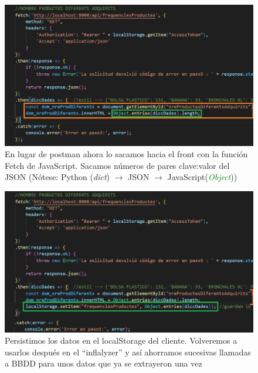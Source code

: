 \documentclass{beamer}
\begin{document}
		\begin{frame}
	
			\begin{figure}
				\centering
				\includegraphics[width=.9\linewidth]{imgEspecifiques/dashboardB}
				\caption{En lugar de postman ahora lo sacamos hacia el front con la función Fetch de JavaScript. Sacamos números de pares clave:valor del JSON (Nótese: Python (\textit{dict}) $\rightarrow$ JSON $\rightarrow$ JavaScript(\textit{\textcolor{green}{Object}}))}
				\label{fig:dashboardB}
			\end{figure}
			
		\end{frame}
		
		
				\begin{frame}
			
			\begin{figure}
				\centering
				\includegraphics[width=.9\linewidth]{imgEspecifiques/dashboardC}
				\caption{Persistimos los datos en el localStorage del cliente. Volveremos a usarlos después en el ``inflalyzer'' y así ahorramos sucesivas llamadas a BBDD para unos datos que ya se extrayeron una vez}
				\label{fig:dashboardC}
			\end{figure}
			
		\end{frame}
		
\end{document}
